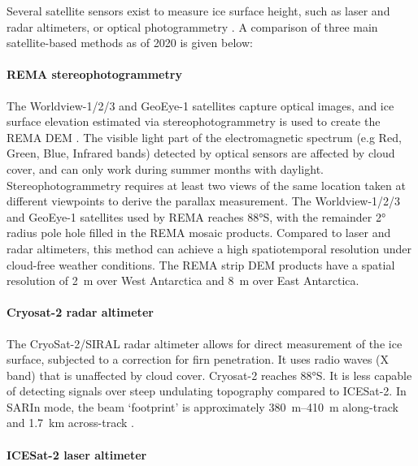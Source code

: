 Several satellite sensors exist to measure ice surface height, such as laser and radar altimeters, or optical photogrammetry \citep[see][for a review]{Frickerdecadeprogressobserving2016}.
A comparison of three main satellite-based methods as of 2020 is given below:

\paragraph{REMA stereophotogrammetry}

The Worldview-1/2/3 and GeoEye-1 satellites capture optical images, and ice surface elevation estimated via stereophotogrammetry is used to create the REMA \gls{DEM} \citep{HowatReferenceElevationModel2019}.
The visible light part of the electromagnetic spectrum (e.g Red, Green, Blue, Infrared bands) detected by optical sensors are affected by cloud cover, and can only work during summer months with daylight.
Stereophotogrammetry requires at least two views of the same location taken at different viewpoints to derive the parallax measurement.
The Worldview-1/2/3 and GeoEye-1 satellites used by REMA reaches 88°S, with the remainder 2° radius pole hole filled in the REMA mosaic products.
Compared to laser and radar altimeters, this method can achieve a high spatiotemporal resolution under cloud-free weather conditions.
The REMA strip \gls{DEM} products have a spatial resolution of \SI{2}{\metre} over West Antarctica and \SI{8}{\metre} over East Antarctica.

\paragraph{Cryosat-2 radar altimeter}

The CryoSat-2/SIRAL radar altimeter \citep[2010- ;][]{WinghamCryoSatmissiondetermine2006} allows for direct measurement of the ice surface, subjected to a correction for firn penetration.
It uses radio waves (X band) that is unaffected by cloud cover.
Cryosat-2 reaches 88°S.
It is less capable of detecting signals over steep undulating topography compared to ICESat-2.
In SARIn mode, the beam `footprint' is approximately \SIrange{380}{410}{\metre} along-track and \SI{1.7}{\kilo\metre} across-track \citep{McMillanThreedimensionalmappingCryoSat22013}.

\paragraph{ICESat-2 laser altimeter}

